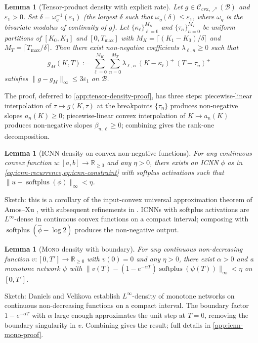 \documentclass[largeformat]{interact}
\let\cite\citep   %
\theoremstyle{plain}
\newtheorem{lemma}[theorem]{Lemma}
\theoremstyle{definition}
\newcommand{\R}{\mathbb{R}}
\DeclareMathOperator{\softplus}{softplus}
\newcommand{\eps}{\varepsilon}
\newcommand{\eqdef}{:=}
\newcommand{\icnn}{\textsc{ICNN}}
\newcommand{\mononet}{\textsc{Mono}}
\begin{document}
\begin{lemma}[Tensor-product density with explicit rate]
\label{lem:tensor-density}
Let $g \in \mathcal{C}_{\mathrm{cvx},\nearrow}(\mathcal{B})$ and $\eps_1 > 0$. Set $\delta = \omega_g^{-1}(\eps_1)$ (the largest $\delta$ such that $\omega_g(\delta) \leq \eps_1$, where $\omega_g$ is the bivariate modulus of continuity of $g$). Let $\{\kappa_\ell\}_{\ell=0}^{M_K}$ and $\{\tau_n\}_{n=0}^{M_T}$ be uniform partitions of $[K_0, K_1]$ and $[0, T_{\max}]$ with $M_K = \lceil (K_1 - K_0)/\delta\rceil$ and $M_T = \lceil T_{\max}/\delta\rceil$. Then there exist non-negative coefficients $\lambda_{\ell,n} \geq 0$ such that
\begin{equation}
g_M(K, T) \eqdef \sum_{\ell=0}^{M_K} \sum_{n=0}^{M_T} \lambda_{\ell,n}\,(K - \kappa_\ell)^+\,(T - \tau_n)^+
\end{equation}
satisfies $\|g - g_M\|_\infty \leq 3\eps_1$ on $\mathcal{B}$.
\end{lemma}
The proof, deferred to \cref{app:tensor-density-proof}, has three steps: piecewise-linear interpolation of $\tau \mapsto g(K, \tau)$ at the breakpoints $\{\tau_n\}$ produces non-negative slopes $a_n(K) \geq 0$; piecewise-linear convex interpolation of $K \mapsto a_n(K)$ produces non-negative slopes $\beta_{n,\ell} \geq 0$; combining gives the rank-one decomposition.

\begin{lemma}[\icnn{} density on convex non-negative functions]
\label{lem:icnn-approx}
For any continuous convex function $u : [a, b] \to \R_{\geq 0}$ and any $\eta > 0$, there exists an ICNN $\phi$ as in \cref{eq:icnn-recurrence,eq:icnn-constraint} with softplus activations such that $\|u - \softplus(\phi)\|_\infty < \eta$.
\end{lemma}
Sketch: this is a corollary of the input-convex universal approximation theorem of Amos--Xu \citeyearpar{amos2017input}, with subsequent refinements in \cite{chen2018optimal,bunne2022supervised}. ICNNs with softplus activations are $L^\infty$-dense in continuous convex functions on a compact interval; composing with $\softplus(\widehat\phi - \log 2)$ produces the non-negative output.

\begin{lemma}[\mononet{} density with boundary]
\label{lem:mononet-approx}
For any continuous non-decreasing function $v : [0, T'] \to \R_{\geq 0}$ with $v(0) = 0$ and any $\eta > 0$, there exist $\alpha > 0$ and a monotone network $\psi$ with $\bigl\|v(T) - (1 - e^{-\alpha T})\softplus(\psi(T))\bigr\|_\infty < \eta$ on $[0, T']$.
\end{lemma}
Sketch: Daniels and Velikova \citeyearpar{daniels2010monotone} establish $L^\infty$-density of monotone networks on continuous non-decreasing functions on a compact interval. The boundary factor $1 - e^{-\alpha T}$ with $\alpha$ large enough approximates the unit step at $T = 0$, removing the boundary singularity in $v$. Combining gives the result; full details in \cref{app:icnn-mono-proof}.
\end{document}
